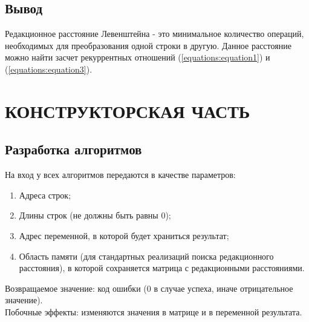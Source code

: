 \documentclass[a4paper,12pt]{article}
\begin{document}
\newpage
\subsection{Вывод}
\begin{flushleft}
Редакционное расстояние Левенштейна - это минимальное количество операций, необходимых для преобразования одной строки в другую. Данное расстояние можно найти засчет рекуррентных отношений (\ref{equations:equation1}) и (\ref{equations:equation3}).
\end{flushleft}


\newpage
\section{КОНСТРУКТОРСКАЯ ЧАСТЬ}

\subsection{Разработка алгоритмов}

На вход у всех алгоритмов передаются в качестве параметров:
\begin{enumerate}
\item Адреса строк;
\item Длины строк (не должны быть равны 0);
\item Адрес переменной, в которой будет храниться результат;
\item Область памяти (для стандартных реализаций поиска редакционного расстояния), в которой сохраняется матрица с редакционными расстояниями.
\end{enumerate}
Возвращаемое значение: код ошибки (0 в случае успеха, иначе отрицательное значение). \\
Побочные эффекты: изменяются значения в матрице и в переменной результата.

\newpage
\end{document}
